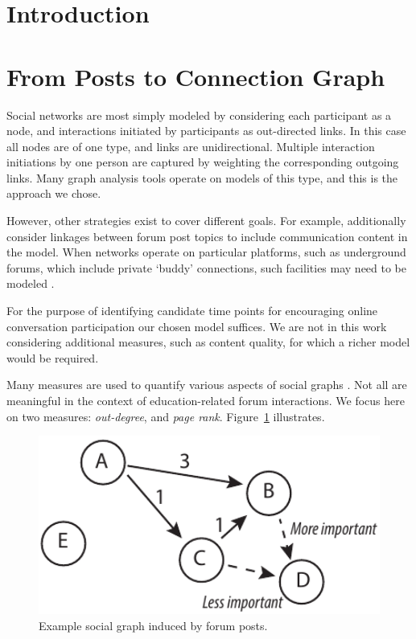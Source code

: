 \section{Introduction}


\section{From Posts to Connection Graph}

Social networks are most simply modeled by considering each
participant as a node, and interactions initiated by participants as
out-directed links. In this case all nodes are of one type, and links
are unidirectional. Multiple interaction initiations by one person are
captured by weighting the corresponding outgoing links. Many graph
analysis tools operate on models of this type, and this is the
approach we chose.

However, other strategies exist to cover different goals. For example,
\cite{Anwar2013} additionally consider linkages between forum post
topics to include communication content in the model. When networks
operate on particular platforms, such as underground forums, which
include private `buddy' connections, such facilities may need to be
modeled \cite{Moto2011}.

For the purpose of identifying candidate time points for encouraging
online conversation participation our chosen model suffices. We are
not in this work considering additional measures, such as content
quality, for which a richer model would be required.

Many measures are used to quantify various aspects of social graphs
\cite{***}. Not all are meaningful in the context of education-related
forum interactions. We focus here on two measures: {\em out-degree},
and {\em page rank}. Figure~\ref{fig:graphExpl} illustrates.

\begin{figure}[htp]
       \centering
       \includegraphics[width=1.0\textwidth]{Figs/forumNetworkExample.pdf}
       \caption{\textnormal{Example social graph induced by forum posts.}}
       \label{fig:graphExpl}
\end{figure}

